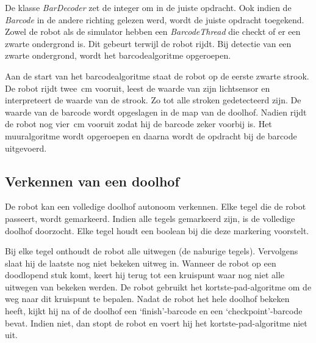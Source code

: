 \documentclass[t1]{penoverslag}
\begin{document}
De klasse \textit{BarDecoder} zet de integer om in de juiste opdracht. Ook indien de \textit{Barcode} in de andere richting gelezen werd, wordt de juiste opdracht toegekend.\\

Zowel de robot als de simulator hebben een \textit{BarcodeThread} die checkt of er een zwarte ondergrond is. Dit gebeurt terwijl de robot rijdt. Bij detectie van een zwarte ondergrond, wordt het barcodealgoritme opgeroepen.

Aan de start van het barcodealgoritme staat de robot op de eerste zwarte strook. De robot rijdt twee~cm vooruit, leest de waarde van zijn lichtsensor en interpreteert de waarde van de strook. Zo tot alle stroken gedetecteerd zijn. De waarde van de barcode wordt opgeslagen in de map van de doolhof. Nadien rijdt de robot nog vier~cm vooruit zodat hij de barcode zeker voorbij is. Het muuralgoritme wordt opgeroepen en daarna wordt de opdracht bij de barcode uitgevoerd.


\subsection{Verkennen van een doolhof} %
\label{ssec:algoOnderzDoolhof}

De robot kan een volledige doolhof autonoom verkennen. Elke tegel die de robot passeert, wordt gemarkeerd. Indien alle tegels gemarkeerd zijn, is de volledige doolhof doorzocht. Elke tegel houdt een boolean bij die deze markering voorstelt.

Bij elke tegel onthoudt de robot alle uitwegen (de naburige tegels). Vervolgens slaat hij de laatste nog niet bekeken uitweg in. Wanneer de robot op een doodlopend stuk komt, keert hij terug tot een kruispunt waar nog niet alle uitwegen van bekeken werden. De robot gebruikt het kortste-pad-algoritme om de weg naar dit kruispunt te bepalen.
Nadat de robot het hele doolhof bekeken heeft, kijkt hij na of de doolhof een `finish'-barcode en een `checkpoint'-barcode bevat. Indien niet, dan stopt de robot en voert hij het kortste-pad-algoritme niet uit.\\
\end{document}
